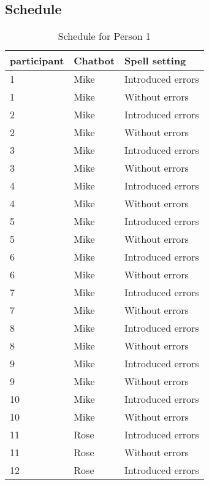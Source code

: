 \subsection{Schedule}

\begin{table}[!ht]
   \begin{center}
      \caption{Schedule for Person 1}
      \label{tabscheduleperson1}
      \vskip 0.12in
      \begin{tabular}[center]{| l | l | l |}
         \hline
         participant & Chatbot & Spell setting \\
         \hline \hline
         1 & Mike & Introduced errors \\
         1 & Mike & Without errors \\
         \hline
         2 & Mike & Introduced errors \\
         2 & Mike & Without errors \\
         \hline
         3 & Mike & Introduced errors \\
         3 & Mike & Without errors \\
         \hline
         4 & Mike & Introduced errors \\
         4 & Mike & Without errors \\
         \hline
         5 & Mike & Introduced errors \\
         5 & Mike & Without errors \\
         \hline
         6 & Mike & Introduced errors \\
         6 & Mike & Without errors \\
         \hline
         7 & Mike & Introduced errors \\
         7 & Mike & Without errors \\
         \hline
         8 & Mike & Introduced errors \\
         8 & Mike & Without errors \\
         \hline
         9 & Mike & Introduced errors \\
         9 & Mike & Without errors \\
         \hline
         10 & Mike & Introduced errors \\
         10 & Mike & Without errors \\
         \hline \hline
         11 & Rose & Introduced errors \\
         11 & Rose & Without errors \\
         \hline
         12 & Rose & Introduced errors \\

\end{tabular}
\end{center}
\end{table}
